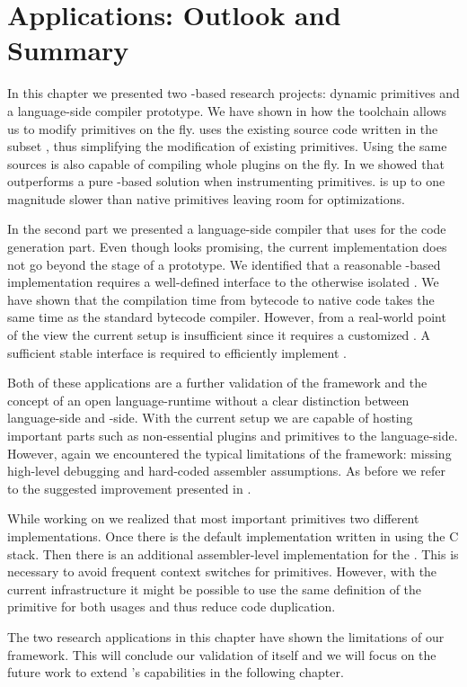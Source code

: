 \newpage
\section{\B Applications: Outlook and Summary}

In this chapter we presented two \B-based research projects: dynamic primitives and a language-side \JIT compiler prototype.
We have shown in  how the \WF toolchain allows us to modify \PH primitives on the fly. 
\WF uses the existing \VM source code written in the \ST subset \Slang, thus simplifying the modification of existing primitives.
Using the same \Slang sources \WF is also capable of compiling whole plugins on the fly.
In  we showed that \WF outperforms a pure \PH-based solution when instrumenting primitives.
\WF is up to one magnitude slower than native \VM primitives leaving room for optimizations.

In the second part we presented \NBJ a language-side \JIT compiler that uses \B for the code generation part.
Even though \NBJ looks promising, the current implementation does not go beyond the stage of a prototype.
We identified that a reasonable \B-based \JIT implementation requires a well-defined interface to the otherwise isolated \JIT.
We have shown that the compilation time from bytecode to native code takes the same time as the standard bytecode compiler.
However, from a real-world point of the view the current \NBJ setup is insufficient since it requires a customized \VM.
A sufficient stable \JIT interface is required to efficiently implement \NBJ.

Both of these applications are a further validation of the \B framework and the concept of an open language-runtime without a clear distinction between language-side and \VM-side.
With the current setup we are capable of hosting important \VM parts such as non-essential plugins and primitives to the language-side.
However, again we encountered the typical limitations of the \B framework: missing high-level debugging and hard-coded assembler assumptions.
As before we refer to the suggested \B improvement presented in .

While working on \NBJ we realized that most important primitives two different implementations.
Once there is the default implementation written in \Slang using the C stack.
Then there is an additional assembler-level implementation for the \JIT.
This is necessary to avoid frequent context switches for primitives.
However, with the current \B infrastructure it might be possible to use the same definition of the primitive for both usages and thus reduce code duplication.

The two \B research applications in this chapter have shown the limitations of our framework.
This will conclude our validation of \B itself and we will focus on the future work to extend \B's capabilities in the following chapter.

